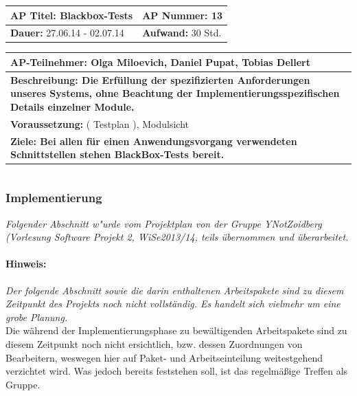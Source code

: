 \documentclass[fontsize=12pt,paper=a4,twoside]{scrartcl}
\begin{document}
\begin{tabular}{|p{7.43cm}|p{7.43cm}|}
\hline
\textbf{AP Titel: }Blackbox-Tests & \textbf{AP Nummer: }13\\ 
\hline
\textbf{Dauer: }27.06.14 - 02.07.14& \textbf{Aufwand: }30 Std.\\
\hline
\end{tabular}
\begin{tabular}{|p{15.3cm}|}
\hline
\textbf{AP-Teilnehmer: }Olga Miloevich, Daniel Pupat, Tobias Dellert\\
\hline
\textbf{Beschreibung: Die Erfüllung der spezifizierten Anforderungen unseres Systems, ohne
Beachtung der Implementierungsspezifischen Details einzelner Module.}\\
\hline
\textbf{Voraussetzung: }( Testplan ), Modulsicht\\
\hline 
\textbf{Ziele: Bei allen für einen Anwendungsvorgang verwendeten Schnittstellen stehen BlackBox-Tests bereit.}\\
\hline 
\end{tabular}
\begin{verbatim}

\end{verbatim}



\subsubsection{Implementierung}\label{aps}

\textit{Folgender Abschnitt w"urde vom Projektplan von der Gruppe YNotZoidberg (Vorlesung Software Projekt 2, WiSe2013/14, teils übernommen und überarbeitet.}

\paragraph{Hinweis:} \textit{Der folgende Abschnitt sowie die darin enthaltenen Arbeitspakete sind zu diesem Zeitpunkt des Projekts noch nicht vollständig. Es handelt sich vielmehr um eine grobe Planung.}\\

Die während der Implementierungsphase zu bewältigenden Arbeitspakete sind zu diesem Zeitpunkt noch nicht ersichtlich, bzw. dessen Zuordnungen von Bearbeitern, weswegen hier auf Paket- und Arbeitseinteilung weitestgehend verzichtet wird. Was jedoch bereits feststehen soll, ist das regelmäßige Treffen als Gruppe. 
\end{document}
